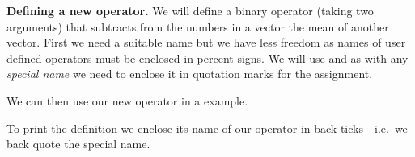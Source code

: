 \documentclass[krantz2]{krantz}\usepackage{knitr}%
\begin{document}
\begin{explainbox}
\textbf{Defining a new operator.} We will define a binary operator (taking two arguments) that subtracts from the numbers in a vector the mean of another vector. First we need a suitable name but we have less freedom as names of user defined operators must be enclosed in percent signs. We will use  and as with any \emph{special name} we need to enclose it in quotation marks for the assignment.

\begin{knitrout}\footnotesize
{}\color{fgcolor}
\end{knitrout}

We can then use our new operator in a example.

\begin{knitrout}\footnotesize
{}\color{fgcolor}
\end{knitrout}

To print the definition we enclose its name of our operator in back ticks---i.e.\ we back quote the special name.

\begin{knitrout}\footnotesize
{}\color{fgcolor}
\end{knitrout}

\end{explainbox}
\end{document}
